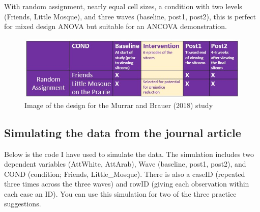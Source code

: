 \documentclass[
  11pt,
]{book}
\begin{document}
With random assignment, nearly equal cell sizes, a condition with two levels (Friends, Little Mosque), and three waves (baseline, post1, post2), this is perfect for mixed design ANOVA but suitable for an ANCOVA demonstration.

\begin{figure}
\centering
\includegraphics{images/mixed/Murrar_design.jpg}
\caption{Image of the design for the Murrar and Brauer (2018) study}
\end{figure}

\hypertarget{simulating-the-data-from-the-journal-article-1}{%
\subsection{Simulating the data from the journal article}\label{simulating-the-data-from-the-journal-article-1}}

Below is the code I have used to simulate the data. The simulation includes two dependent variables (AttWhite, AttArab), Wave (baseline, post1, post2), and COND (condition; Friends, Little\_Mosque). There is also a caseID (repeated three times across the three waves) and rowID (giving each observation within each case an ID). You can use this simulation for two of the three practice suggestions.
\end{document}
